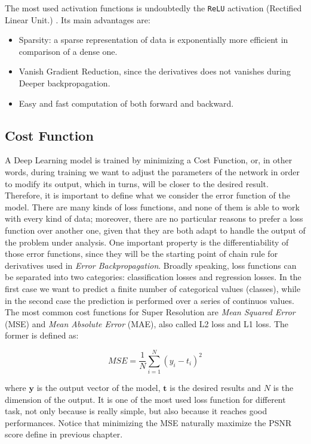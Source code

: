 \documentclass[12pt,a4paper]{report}
\begin{document}
The most used activation functions is undoubtedly the {\tt ReLU} activation (Rectified Linear Unit.) \cite{Relu}. Its main advantages are:

\begin{itemize}
 \setlength\itemsep{-0.2em}
 \item Sparsity: a sparse representation of data is exponentially more efficient in comparison of a dense one.
 \item Vanish Gradient Reduction, since the derivatives does not vanishes during Deeper backpropagation.
 \item Easy and fast computation of both forward and backward.
\end{itemize}

\subsection*{Cost Function}

A Deep Learning model is trained by minimizing a Cost Function, or, in other words, during training we want to adjust the parameters of the network in order to modify its output, which in turns, will be closer to the desired result. 
Therefore, it is important to define what we consider the error function of the model.
There are many kinds of loss functions, and none of them is able to work with every kind of data; moreover, there are no particular reasons to prefer a loss function over another one, given that they are both adapt to handle the output of the problem under analysis. 
One important property is the differentiability of those error functions, since they will be the starting point of chain rule for derivatives used in {\it Error Backpropagation}.
Broadly speaking, loss functions can be separated into two categories: classification losses and regression losses. In the first case we want to predict a finite number of categorical values (classes), while in the second case the prediction is performed over a series of continuos values.
The most common cost functions for Super Resolution are {\it Mean Squared Error} (MSE) and {\it Mean Absolute Error} (MAE), also called L2 loss and L1 loss. 
The former is defined as: 

\begin{equation}
 MSE = \frac{1}{N} \sum_{i=1}^{N} (y_i - t_i)^2
\end{equation}

where $\bm{y}$ is the output vector of the model, $\bm{t}$ is the desired results and $N$ is the dimension of the output.
It is one of the most used loss function for different task, not only because is really simple, but also because it reaches good performances.
Notice that minimizing the MSE naturally maximize the PSNR score define in previous chapter.
\end{document}
